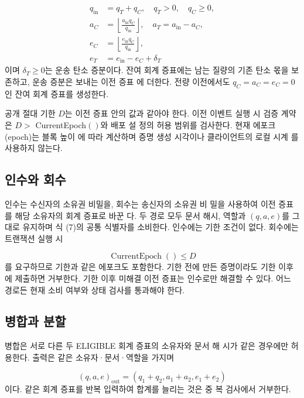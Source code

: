\begin{equation}
    \begin{aligned}q_{\mathrm{in}}&=q_T+q_C,\quad q_T>0,\quad q_C\ge0,\\a_C&=\left\lfloor\frac{a_{\mathrm{in}}q_C}{q_{\mathrm{in}}}\right\rfloor,\quad a_T=a_{\mathrm{in}}-a_C,\\e_C&=\left\lfloor\frac{e_{\mathrm{in}}q_C}{q_{\mathrm{in}}}\right\rfloor,\\e_T&=e_{\mathrm{in}}-e_C+\delta_T\end{aligned}\tag{13}
\end{equation}
이며 \(δ_{T}≥0\)는 운송 탄소 증분이다. 잔여 회계 증표에는 남는
질량의 기존 탄소 몫을 보존하고, 운송 증분은 보내는 이전 증표
에 더한다. 전량 이전에서도 \(q_{C}=a_{C}=e_{C}=0\)인 잔여 회계
증표를 생성한다.

공개 절대 기한 \(D\)는 이전 증표 안의 값과 같아야 한다. 이전
이벤트 실행 시 검증 계약은 \(D>\) CurrentEpoch\(()\)와 배포 설
정의 허용 범위를 검사한다. 현재 에포크(epoch)는 블록 높이
에 따라 계산하며 증명 생성 시각이나 클라이언트의 로컬 시계
를 사용하지 않는다.

\subsection{인수와 회수}
인수는 수신자의 소유권 비밀을, 회수는 송신자의 소유권 비
밀을 사용하여 이전 증표를 해당 소유자의 회계 증표로 바꾼
다. 두 경로 모두 문서 해시, 역할과 \((q,a,e)\)를 그대로 유지하며
식 (7)의 공통 식별자를 소비한다. 인수에는 기한 조건이 없다.
회수에는 트랜잭션 실행 시

\begin{equation}
    \operatorname{CurrentEpoch}()\le D\tag{14}
\end{equation}
를 요구하므로 기한과 같은 에포크도 포함한다. 기한 전에 만든
증명이라도 기한 이후에 제출하면 거부한다. 기한 이후 미해결
이전 증표는 인수로만 해결할 수 있다. 어느 경로든 현재 소비
여부와 상태 검사를 통과해야 한다.


\subsection{병합과 분할}
병합은 서로 다른 두 ELIGIBLE 회계 증표의 소유자와 문서 해
시가 같은 경우에만 허용한다. 출력은 같은 소유자·문서·역할을
가지며

\begin{equation}
    (q,a,e)_{\mathrm{out}}=(q_1+q_2,a_1+a_2,e_1+e_2)\tag{15}
\end{equation}
이다. 같은 회계 증표를 반복 입력하여 합계를 늘리는 것은 중
복 검사에서 거부한다.

